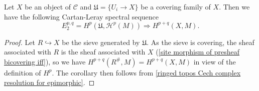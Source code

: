 \begin{corollary}\label{ringed site Leray spectral sequence for covering sieve}
Let $X$ be an object of $\mathcal{C}$ and $\mathfrak{U}=\{U_i\to X\}$ be a covering family of $X$. Then we have the following Cartan-Leray spectral sequence
\begin{equation}\label{ringed site Leray spectral sequence for covering sieve-1}
E_2^{p,q}=H^p(\mathfrak{U},\mathcal{H}^p(M))\Rightarrow H^{p+q}(X,M).
\end{equation}
\end{corollary}
\begin{proof}
Let $R\hookrightarrow X$ be the sieve generated by $\mathfrak{U}$. As the sieve is covering, the sheaf associated with $R$ is the sheaf associated with $X$ (\cref{site morphism of presheaf bicovering iff}), so we have $H^{p+q}(R^\#,M)=H^{p+q}(X,M)$ in view of the definition of $H^p$. The corollary then follows from \cref{ringed topos Cech complex resolution for epimorphic}. 
\end{proof}


